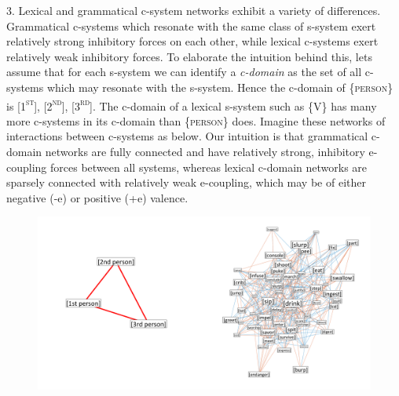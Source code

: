 3. Lexical and grammatical c-system networks exhibit a variety of differences. Grammatical c-systems which resonate with the same class of s-system exert relatively strong inhibitory forces on each other, while lexical c-systems exert relatively weak inhibitory forces. To elaborate the intuition behind this, lets assume that for each s-system we can identify a \textit{c-domain} as the set of all c-systems which may resonate with the s-system. Hence the c-domain of \{\textsc{person}\} is [\textsc{1}\textsc{\textsuperscript{st}}], [\textsc{2}\textsc{\textsuperscript{nd}}], [\textsc{3}\textsc{\textsuperscript{rd}}]. The c-domain of a lexical s-system such as \{V\} has many more c-systems in its c-domain than \{\textsc{person}\} does. Imagine these networks of interactions between c-systems as below. Our intuition is that grammatical c-domain networks are fully connected and have relatively strong, inhibitory e-coupling forces between all systems, whereas lexical c-domain networks are sparsely connected with relatively weak e-coupling, which may be of either negative (-e) or positive (+e) valence.

  
\begin{figure}
\includegraphics[width=\textwidth]{figures/Tilsen-img65.png}
\caption{\missingcaption}
\label{fig:}
\end{figure}
 

